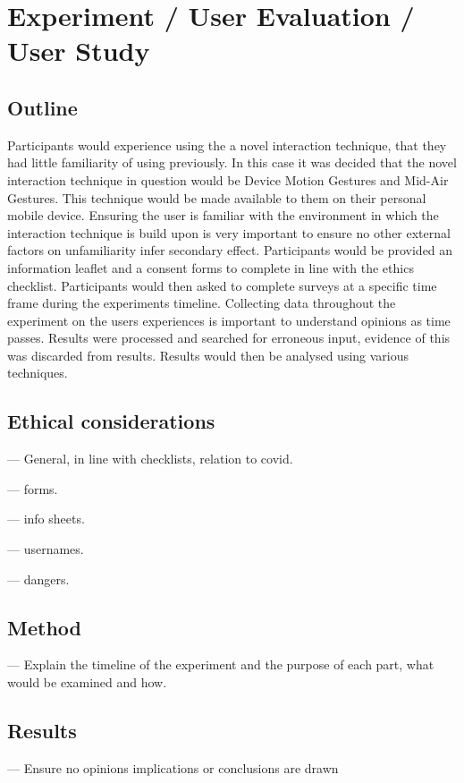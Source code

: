 \documentclass{l4proj}
\begin{document}

\chapter{Experiment / User Evaluation / User Study}

\section{Outline}
Participants would experience using the a novel interaction technique, that they had little familiarity of using previously. In this case it was decided that the novel interaction technique in question would be Device Motion Gestures and Mid-Air Gestures. This technique would be made available to them on their personal mobile device. Ensuring the user is familiar with the environment in which the interaction technique is build upon is very important to ensure no other external factors on unfamiliarity infer secondary effect. Participants would be provided an information leaflet and a consent forms to complete in line with the ethics checklist. Participants would then asked to complete surveys at a specific time frame during the experiments timeline. Collecting data throughout the experiment on the users experiences is important to understand opinions as time passes. Results were processed and searched for erroneous input, evidence of this was discarded from results. Results would then be analysed using various techniques.

\section{Ethical considerations}
--- General, in line with checklists, relation to covid.

--- forms.

--- info sheets.

--- usernames.

--- dangers.

\section{Method}
--- Explain the timeline of the experiment and the purpose of each part, what would be examined and how.


\section{Results} 
--- Ensure no opinions implications or conclusions are drawn
\end{document}
